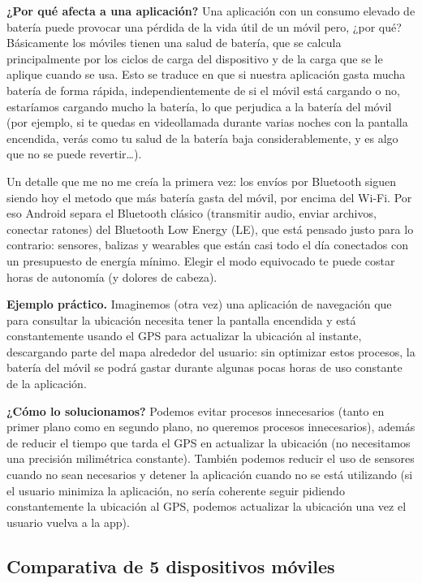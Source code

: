 \documentclass[11pt,a4paper]{article}
\newcommand{\campo}[1]{\textbf{\color{navy}#1}}
\begin{document}
	\campo{¿Por qué afecta a una aplicación?}
	Una aplicación con un consumo elevado de batería puede provocar una pérdida de la vida útil de un móvil pero, ¿por qué? Básicamente los móviles tienen una salud de batería, que se calcula principalmente por los ciclos de carga del dispositivo y de la carga que se le aplique cuando se usa. Esto se traduce en que si nuestra aplicación gasta mucha batería de forma rápida, independientemente de si el móvil está cargando o no, estaríamos cargando mucho la batería, lo que perjudica a la batería del móvil (por ejemplo, si te quedas en videollamada durante varias noches con la pantalla encendida, verás como tu salud de la batería baja considerablemente, y es algo que no se puede revertir\ldots).
	
	Un detalle que me no me creía la primera vez: los envíos por Bluetooth siguen siendo hoy el metodo que más batería gasta del móvil, por encima del Wi-Fi. Por eso Android separa el Bluetooth clásico (transmitir audio, enviar archivos, conectar ratones) del Bluetooth Low Energy (LE), que está pensado justo para lo contrario: sensores, balizas y wearables que están casi todo el día conectados con un presupuesto de energía mínimo. Elegir el modo equivocado te puede costar horas de autonomía (y dolores de cabeza).
	
	\campo{Ejemplo práctico.}
	Imaginemos (otra vez) una aplicación de navegación que para consultar la ubicación necesita tener la pantalla encendida y está constantemente usando el GPS para actualizar la ubicación al instante, descargando parte del mapa alrededor del usuario: sin optimizar estos procesos, la batería del móvil se podrá gastar durante algunas pocas horas de uso constante de la aplicación.
	
	\campo{¿Cómo lo solucionamos?}
	Podemos evitar procesos innecesarios (tanto en primer plano como en segundo plano, no queremos procesos innecesarios), además de reducir el tiempo que tarda el GPS en actualizar la ubicación (no necesitamos una precisión milimétrica constante). También podemos reducir el uso de sensores cuando no sean necesarios y detener la aplicación cuando no se está utilizando (si el usuario minimiza la aplicación, no sería coherente seguir pidiendo constantemente la ubicación al GPS, podemos actualizar la ubicación una vez el usuario vuelva a la app).
	
	\subsection{Comparativa de 5 dispositivos móviles}
	
\end{document}
